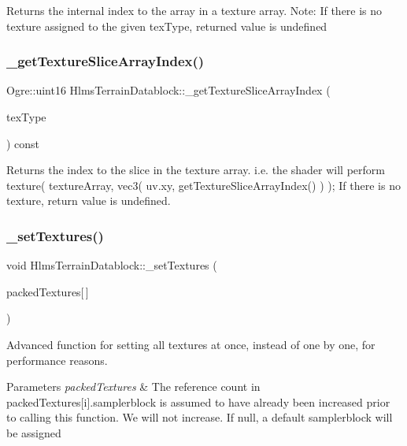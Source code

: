 Returns the internal index to the array in a texture array. Note\+: If there is no texture assigned to the given tex\+Type, returned value is undefined \mbox{\label{class_hlms_terrain_datablock_a19f88d8e892a4fbad4f535dcb41387d5}} 
\subsubsection{\texorpdfstring{\+\_\+get\+Texture\+Slice\+Array\+Index()}{\_getTextureSliceArrayIndex()}}
{\footnotesize\ttfamily Ogre\+::uint16 Hlms\+Terrain\+Datablock\+::\+\_\+get\+Texture\+Slice\+Array\+Index (\begin{DoxyParamCaption}\item[{Terrain\+Texture\+Types}]{tex\+Type }\end{DoxyParamCaption}) const}

Returns the index to the slice in the texture array. i.\+e. the shader will perform texture( texture\+Array, vec3( uv.\+xy, get\+Texture\+Slice\+Array\+Index() ) ); If there is no texture, return value is undefined. \mbox{\label{class_hlms_terrain_datablock_a9491ff27ef7052bcce3edb825acc61fe}} 
\subsubsection{\texorpdfstring{\+\_\+set\+Textures()}{\_setTextures()}}
{\footnotesize\ttfamily void Hlms\+Terrain\+Datablock\+::\+\_\+set\+Textures (\begin{DoxyParamCaption}\item[{const \hyperlink{struct_packed_texture}{Packed\+Texture}}]{packed\+Textures\mbox{[}$\,$\mbox{]} }\end{DoxyParamCaption})}

Advanced function for setting all textures at once, instead of one by one, for performance reasons. 
\begin{DoxyParams}{Parameters}
{\em packed\+Textures} & The reference count in packed\+Textures\mbox{[}i\mbox{]}.samplerblock is assumed to have already been increased prior to calling this function. We will not increase. If null, a default samplerblock will be assigned \\
\hline
\end{DoxyParams}
\mbox{\label{class_hlms_terrain_datablock_a08b7b8e53cd57ca6729929602d24411a}} 
